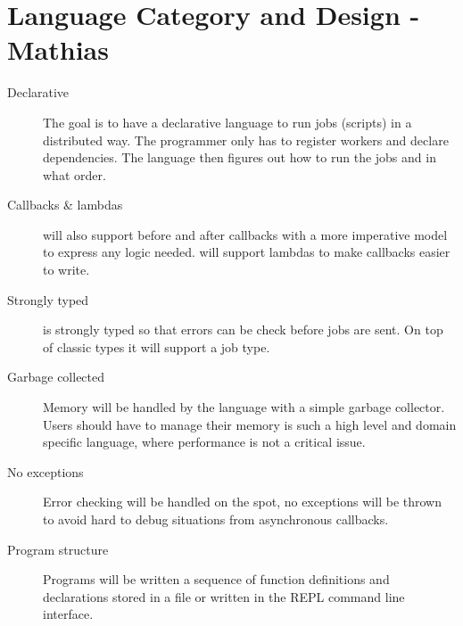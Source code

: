 \section{Language Category and Design - Mathias}
\label{sect:desg}
\begin{description}
\item[Declarative] The goal is to have a declarative language to run jobs
(scripts) in a distributed way. The programmer only has to register workers and
declare dependencies. The language then figures out how to run the jobs and in
what order.
\item[Callbacks & lambdas] \lang will also support before and after callbacks
with a more imperative model to express any logic needed. \lang will support
lambdas to make callbacks easier to write.
\item[Strongly typed] \lang is strongly typed so that errors can be check
before jobs are sent. On top of classic types it will support a job type.
\item[Garbage collected] Memory will be handled by the language with a simple
garbage collector. Users should have to manage their memory is such a high
level and domain specific language, where performance is not a critical issue.
\item[No exceptions] Error checking will be handled on the spot, no exceptions
will be thrown to avoid hard to debug situations from asynchronous callbacks.
\item[Program structure] Programs will be written a sequence of function
definitions and declarations stored in a file or written in the REPL command line
interface.
\end{description}

